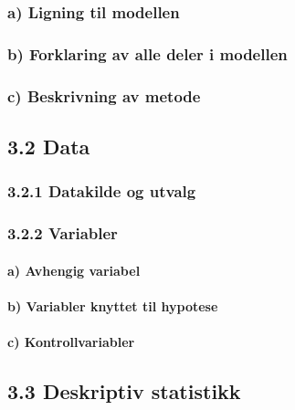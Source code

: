 \documentclass[
  12pt,
  a4paper,
  DIV=11,
  numbers=noendperiod]{scrartcl}
\let\oldparagraph\paragraph
\renewcommand{\paragraph}[1]{\oldparagraph{#1}\mbox{}}
\begin{document}
\subsubsection{a) Ligning til modellen}\label{a-ligning-til-modellen}

\subsubsection{b) Forklaring av alle deler i
modellen}\label{b-forklaring-av-alle-deler-i-modellen}

\subsubsection{c) Beskrivning av metode}\label{c-beskrivning-av-metode}

\subsection{3.2 Data}\label{data}

\subsubsection{3.2.1 Datakilde og utvalg}\label{datakilde-og-utvalg}

\subsubsection{3.2.2 Variabler}\label{variabler}

\paragraph{a) Avhengig variabel}\label{a-avhengig-variabel}

\paragraph{b) Variabler knyttet til
hypotese}\label{b-variabler-knyttet-til-hypotese}

\paragraph{c) Kontrollvariabler}\label{c-kontrollvariabler}

\subsection{3.3 Deskriptiv statistikk}\label{deskriptiv-statistikk}
\end{document}
